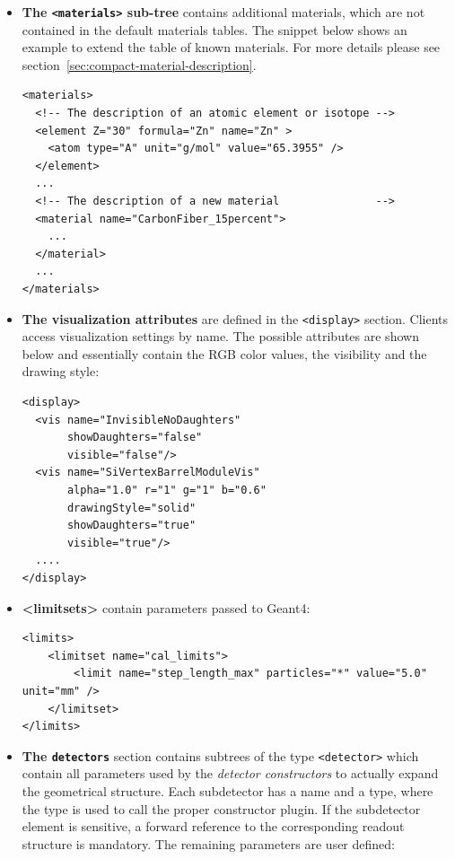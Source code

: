 \begin{itemize}
\item  {\textbf{The \texttt{<materials>} sub-tree}} contains additional materials, which are not contained in the default materials tables. The snippet below shows an example to extend the table of known materials. For more details please see section~\ref{sec:compact-material-description}.
\begin{verbatim}
<materials>
  <!-- The description of an atomic element or isotope -->
  <element Z="30" formula="Zn" name="Zn" >
    <atom type="A" unit="g/mol" value="65.3955" />
  </element>
  ...
  <!-- The description of a new material               -->
  <material name="CarbonFiber_15percent">
    ...
  </material>
  ...
</materials>
\end{verbatim}

\item {\textbf{The visualization attributes}} are defined in the \texttt{<display>} section. Clients access visualization settings by name. The possible attributes are shown below and essentially contain the RGB color values, the visibility and the drawing style:
\begin{verbatim}
<display>
  <vis name="InvisibleNoDaughters"      
       showDaughters="false" 
       visible="false"/>
  <vis name="SiVertexBarrelModuleVis" 
       alpha="1.0" r="1" g="1" b="0.6" 
       drawingStyle="solid" 
       showDaughters="true" 
       visible="true"/>
  ....
</display>
\end{verbatim}

\item {\textbf{<limitsets>}} contain parameters passed to Geant4:
\begin{verbatim}
<limits>
    <limitset name="cal_limits">
        <limit name="step_length_max" particles="*" value="5.0" unit="mm" />
    </limitset>
</limits>
\end{verbatim}

\item {\textbf{The \texttt{detectors}}} section contains subtrees of the type \texttt{<detector>} which contain all parameters used by the \textit{detector constructors} to actually expand the geometrical structure. Each subdetector has a name and a type, where the type is used to call the proper constructor plugin. If the subdetector element is sensitive, a forward reference to the corresponding readout structure is mandatory. The remaining parameters are user defined:


\end{itemize}
